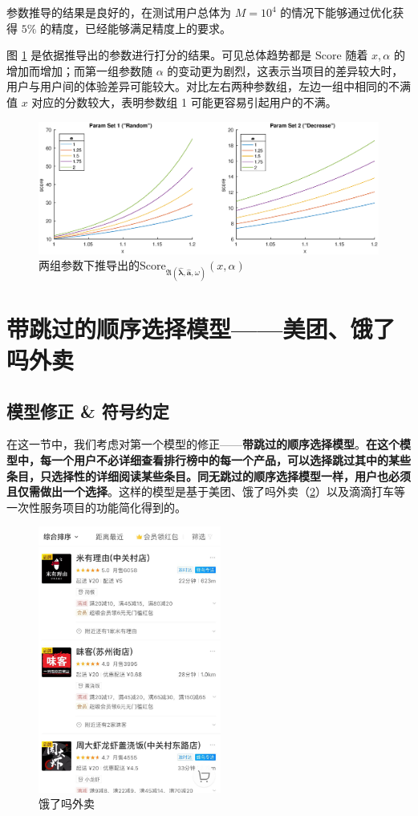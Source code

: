 \documentclass[UTF8]{ctexart}
\theoremstyle{plain}
\theoremstyle{definition}
\theoremstyle{remark}
\begin{document}
	参数推导的结果是良好的，在测试用户总体为 $M=10^4$ 的情况下能够通过优化获得 $5\%$ 的精度，已经能够满足精度上的要求。

	图 \ref{fig:random-decrease-score-compare-M-10000} 是依据推导出的参数进行打分的结果。可见总体趋势都是 $\text{Score}$ 随着 $x, \alpha$ 的增加而增加；而第一组参数随 $\alpha$ 的变动更为剧烈，这表示当项目的差异较大时，用户与用户间的体验差异可能较大。对比左右两种参数组，左边一组中相同的不满值 $x$ 对应的分数较大，表明参数组 1 可能更容易引起用户的不满。
	
	\begin{figure}[h!]
		\centering
		\includegraphics[width = \linewidth]{../model/steam/pic/random-decrease-score-compare-M-10000.eps}
		\caption{两组参数下推导出的$\mathrm{Score}_{\mathfrak{A}\left(\bm{\hat{\lambda}}, \bm{\hat{a}}, \omega\right)}(x, \alpha)$}\label{fig:random-decrease-score-compare-M-10000}
	\end{figure}
	
	
	\section{带跳过的顺序选择模型——美团、饿了吗外卖}
	\subsection{模型修正 \& 符号约定}
	在这一节中，我们考虑对第一个模型的修正——\textbf{带跳过的顺序选择模型}。\textbf{在这个模型中，每一个用户不必详细查看排行榜中的每一个产品，可以选择跳过其中的某些条目，只选择性的详细阅读某些条目。同无跳过的顺序选择模型一样，用户也必须且仅需做出一个选择}。这样的模型是基于美团、饿了吗外卖（\ref{modelB_fig_1}）以及滴滴打车等一次性服务项目的功能简化得到的。
	\begin{figure}[h!]
		\centering
		\includegraphics[width = 6cm]{modelB_fig_1.jpg}
		\caption{饿了吗外卖}\label{modelB_fig_1}
	\end{figure}
	
\end{document}
